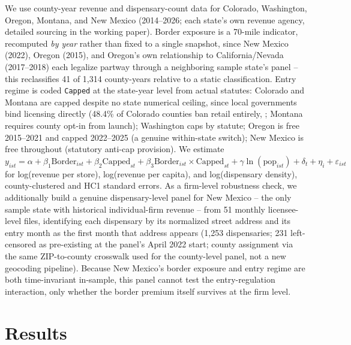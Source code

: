 \documentclass[5p]{elsarticle}
\begin{document}
We use county-year revenue and dispensary-count data for Colorado, Washington, Oregon, Montana, and New
Mexico (2014--2026; each state's own revenue agency, detailed sourcing in the working paper). Border exposure
is a 70-mile indicator, recomputed \emph{by year} rather than fixed to a single snapshot, since New Mexico
(2022), Oregon (2015), and Oregon's own relationship to California/Nevada (2017--2018) each legalize partway
through a neighboring sample state's panel -- this reclassifies 41 of 1{,}314 county-years relative to a
static classification. Entry regime is coded \texttt{Capped} at the state-year level from actual statutes:
Colorado and Montana are capped despite no state numerical ceiling, since local governments bind licensing
directly (48.4\% of Colorado counties ban retail entirely, \citealp{PayanBrownSong2021}; Montana requires
county opt-in from launch); Washington caps by statute; Oregon is free 2015--2021 and capped 2022--2025 (a
genuine within-state switch); New Mexico is free throughout (statutory anti-cap provision). We estimate
$y_{ist} = \alpha + \beta_1 \text{Border}_{ist} + \beta_2 \text{Capped}_{st} + \beta_3 \text{Border}_{ist}
\times \text{Capped}_{st} + \gamma\ln(\text{pop}_{ist}) + \delta_t + \eta_i + \varepsilon_{ist}$ for
log(revenue per store), log(revenue per capita), and log(dispensary density), county-clustered and HC1
standard errors. As a firm-level robustness check, we additionally build a genuine dispensary-level panel for
New Mexico -- the only sample state with historical individual-firm revenue -- from 51 monthly licensee-level
files, identifying each dispensary by its normalized street address and its entry month as the first month
that address appears (1{,}253 dispensaries; 231 left-censored as pre-existing at the panel's April 2022 start;
county assignment via the same ZIP-to-county crosswalk used for the county-level panel, not a new geocoding
pipeline). Because New Mexico's border exposure and entry regime are both time-invariant in-sample, this panel
cannot test the entry-regulation interaction, only whether the border premium itself survives at the firm
level.

\section{Results}


\end{document}
